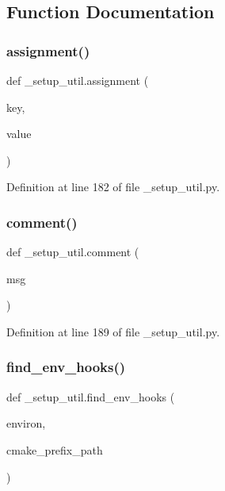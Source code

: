 \subsection{Function Documentation}
\mbox{\label{namespace__setup__util_ad56c24837fa4eddc63c03fbc7035628f}} 
\subsubsection{\texorpdfstring{assignment()}{assignment()}}
{\footnotesize\ttfamily def \+\_\+setup\+\_\+util.\+assignment (\begin{DoxyParamCaption}\item[{}]{key,  }\item[{}]{value }\end{DoxyParamCaption})}



Definition at line 182 of file \+\_\+setup\+\_\+util.\+py.

\mbox{\label{namespace__setup__util_abe8c95c4cfe8b1374dacd5f91d984353}} 
\subsubsection{\texorpdfstring{comment()}{comment()}}
{\footnotesize\ttfamily def \+\_\+setup\+\_\+util.\+comment (\begin{DoxyParamCaption}\item[{}]{msg }\end{DoxyParamCaption})}



Definition at line 189 of file \+\_\+setup\+\_\+util.\+py.

\mbox{\label{namespace__setup__util_a73de35ca77f260af6691470342ab49ce}} 
\subsubsection{\texorpdfstring{find\+\_\+env\+\_\+hooks()}{find\_env\_hooks()}}
{\footnotesize\ttfamily def \+\_\+setup\+\_\+util.\+find\+\_\+env\+\_\+hooks (\begin{DoxyParamCaption}\item[{}]{environ,  }\item[{}]{cmake\+\_\+prefix\+\_\+path }\end{DoxyParamCaption})}

